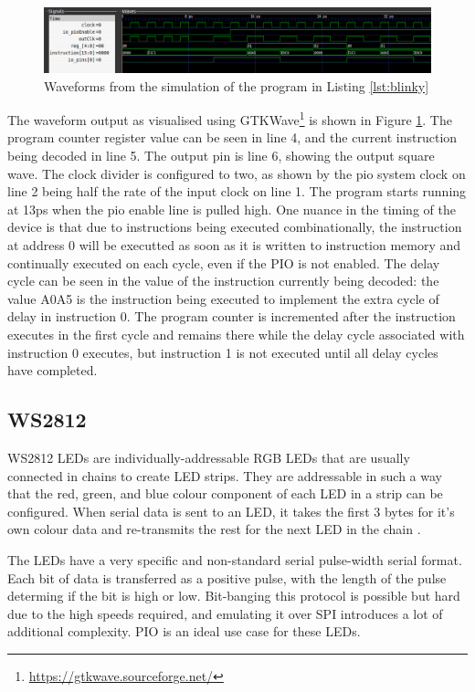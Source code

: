 \begin{figure}[H]
    \centering
    \includegraphics[width=\textwidth]{../img/wave-blink.png}
    \caption{Waveforms from the simulation of the program in Listing \ref{lst:blinky}}
    \label{fig:wave-blink}
\end{figure}

The waveform output as visualised using GTKWave\footnote{\url{https://gtkwave.sourceforge.net/}} is shown in Figure \ref{fig:wave-blink}. The program counter register value can be seen in line 4, and the current instruction being decoded in line 5. The output pin is line 6, showing the output square wave. The clock divider is configured to two, as shown by the pio system clock on line 2 being half the rate of the input clock on line 1. The program starts running at 13ps when the pio enable line is pulled high. One nuance in the timing of the device is that due to instructions being executed combinationally, the instruction at address 0 will be executted as soon as it is written to instruction memory and continually executed on each cycle, even if the PIO is not enabled. The delay cycle can be seen in the value of the instruction currently being decoded: the value A0A5 is the  instruction being executed to implement the extra cycle of delay in instruction 0. The program counter is incremented after the instruction executes in the first cycle and remains there while the delay cycle associated with instruction 0 executes, but instruction 1 is not executed until all delay cycles have completed.

\subsection{WS2812}

WS2812 LEDs are individually-addressable RGB LEDs that are usually connected in chains to create LED strips. They are addressable in such a way that the red, green, and blue colour component of each LED in a strip can be configured. When serial data is sent to an LED, it takes the first 3 bytes for it's own colour data and re-transmits the rest for the next LED in the chain \cite{picosdk,ws2812}.

The LEDs have a very specific and non-standard serial pulse-width serial format. Each bit of data is transferred as a positive pulse, with the length of the pulse determing if the bit is high or low. Bit-banging this protocol is possible but hard due to the high speeds required, and emulating it over SPI introduces a lot of additional complexity. PIO is an ideal use case for these LEDs.

